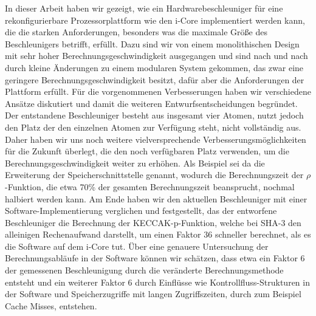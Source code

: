 In dieser Arbeit haben wir gezeigt, wie ein Hardwarebeschleuniger für eine rekonfigurierbare Prozessorplattform
wie den i-Core implementiert werden kann, die die starken Anforderungen, besonders was die maximale Größe des Beschleunigers betrifft, erfüllt.
Dazu sind wir von einem monolithischen Design mit sehr hoher Berechnungsgeschwindigkeit ausgegangen und sind
nach und nach durch kleine Änderungen zu einem modularen System gekommen, das zwar eine geringere
Berechnungsgeschwindigkeit besitzt, dafür aber die Anforderungen der Plattform erfüllt.
Für die vorgenommenen Verbesserungen haben wir verschiedene Ansätze diskutiert und damit die weiteren
Entwurfsentscheidungen begründet. Der entstandene Beschleuniger besteht aus insgesamt vier Atomen,
nutzt jedoch den Platz der den einzelnen Atomen zur Verfügung steht, nicht vollständig aus.
Daher haben wir uns noch weitere vielversprechende Verbesserungsmöglichkeiten für die Zukunft überlegt,
die den noch verfügbaren Platz verwenden, um die Berechnungsgeschwindigkeit weiter zu erhöhen.
Als Beispiel sei da die Erweiterung der Speicherschnittstelle genannt, wodurch die Berechnungszeit der
$\rho$-Funktion, die etwa 70\% der gesamten Berechnungszeit beansprucht, nochmal halbiert werden kann.
Am Ende haben wir den aktuellen Beschleuniger mit einer Software-Implementierung verglichen und festgestellt,
das der entworfene Beschleuniger die Berechnung der KECCAK-p-Funktion, welche bei SHA-3 den alleinigen Rechenaufwand darstellt,
um einen Faktor 36 schneller berechnet, als es die Software auf dem i-Core tut. Über eine genauere Untersuchung
der Berechnungsabläufe in der Software können wir schätzen, dass etwa ein Faktor 6 der gemessenen Beschleunigung
durch die veränderte Berechnungsmethode entsteht und ein weiterer Faktor 6 durch Einflüsse wie Kontrollfluss-Strukturen
in der Software und Speicherzugriffe mit langen Zugriffszeiten, durch zum Beispiel Cache Misses, entstehen.